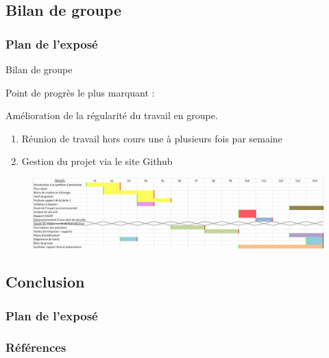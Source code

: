 \documentclass{beamer}
\begin{document}
	
	\begin{frame}
	        \section{Bilan de groupe}
		\frametitle{Plan de l'exposé}
		\tableofcontents[currentsubsection,sectionstyle=show/shaded,subsectionstyle=show/shaded/hide]
	\end{frame}
	
	\begin{frame}{Bilan de groupe}
	
		{\LARGE Point de progrès le plus marquant :}
		
		Amélioration de la régularité du travail en groupe.
		\begin{enumerate}
		\item Réunion de travail hors cours une à plusieurs fois par semaine
		\item Gestion du projet via le site Github
		\end{enumerate}
		\begin{figure}
			\centering
			\includegraphics[scale=0.17]{media/DiagrammeDeGantt.png}
		\end{figure}
	\end{frame}
	
	\begin{frame}
		\section{Conclusion}
		\frametitle{Plan de l'exposé}
		\tableofcontents[currentsubsection,sectionstyle=show/shaded,subsectionstyle=show/shaded/hide]
	\end{frame}
	
	\begin{frame}[allowframebreaks]
	\frametitle{Références}
		\tiny
		
		
		\nocite{*}
	\end{frame}
	
\end{document}
